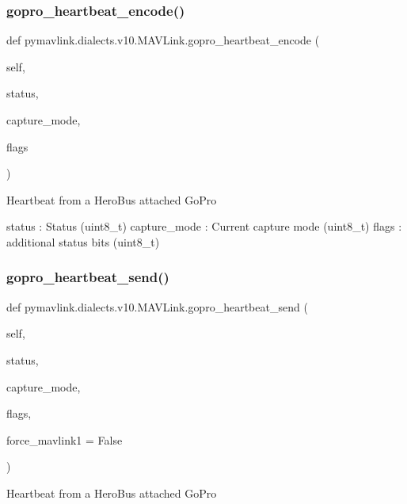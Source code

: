 \begin{DoxyVerb}
\begin{DoxyVerb}
\subsubsection{\texorpdfstring{gopro\+\_\+heartbeat\+\_\+encode()}{gopro\_heartbeat\_encode()}}
{\footnotesize\ttfamily def pymavlink.\+dialects.\+v10.\+M\+A\+V\+Link.\+gopro\+\_\+heartbeat\+\_\+encode (\begin{DoxyParamCaption}\item[{}]{self,  }\item[{}]{status,  }\item[{}]{capture\+\_\+mode,  }\item[{}]{flags }\end{DoxyParamCaption})}

\begin{DoxyVerb}Heartbeat from a HeroBus attached GoPro

status                    : Status (uint8_t)
capture_mode              : Current capture mode (uint8_t)
flags                     : additional status bits (uint8_t)\end{DoxyVerb}
 \mbox{\label{classpymavlink_1_1dialects_1_1v10_1_1MAVLink_ab0901f307204cea761992e0fceb0df74}} 
\subsubsection{\texorpdfstring{gopro\+\_\+heartbeat\+\_\+send()}{gopro\_heartbeat\_send()}}
{\footnotesize\ttfamily def pymavlink.\+dialects.\+v10.\+M\+A\+V\+Link.\+gopro\+\_\+heartbeat\+\_\+send (\begin{DoxyParamCaption}\item[{}]{self,  }\item[{}]{status,  }\item[{}]{capture\+\_\+mode,  }\item[{}]{flags,  }\item[{}]{force\+\_\+mavlink1 = {\ttfamily False} }\end{DoxyParamCaption})}

\begin{DoxyVerb}Heartbeat from a HeroBus attached GoPro


\end{DoxyVerb}
\end{DoxyVerb}
\end{DoxyVerb}
